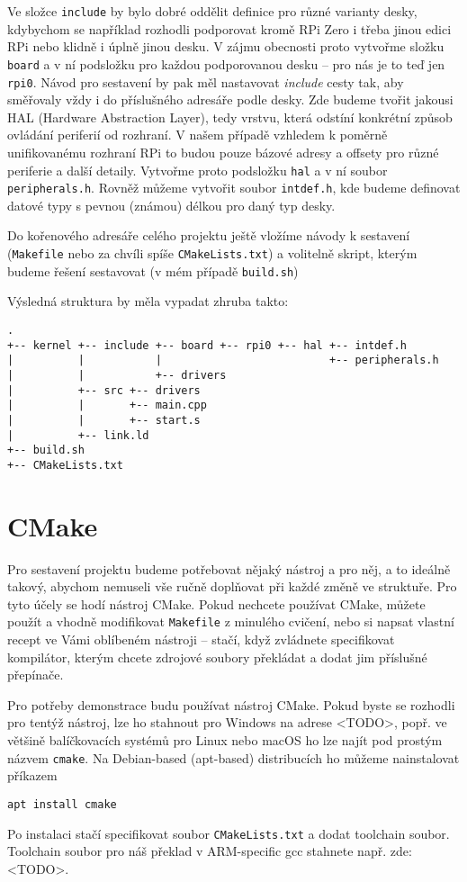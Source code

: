 \documentclass{article}
\begin{document}
Ve složce \texttt{include} by bylo dobré oddělit definice pro různé varianty desky, kdybychom se například rozhodli podporovat kromě RPi Zero i třeba jinou edici RPi nebo klidně i úplně jinou desku. V zájmu obecnosti proto vytvořme složku \texttt{board} a v ní podsložku pro každou podporovanou desku -- pro nás je to teď jen \texttt{rpi0}. Návod pro sestavení by pak měl nastavovat \emph{include} cesty tak, aby směřovaly vždy i do příslušného adresáře podle desky. Zde budeme tvořit jakousi HAL (Hardware Abstraction Layer), tedy vrstvu, která odstíní konkrétní způsob ovládání periferií od rozhraní. V našem případě vzhledem k poměrně unifikovanému rozhraní RPi to budou pouze bázové adresy a offsety pro různé periferie a další detaily. Vytvořme proto podsložku \texttt{hal} a v ní soubor \texttt{peripherals.h}. Rovněž můžeme vytvořit soubor \texttt{intdef.h}, kde budeme definovat datové typy s pevnou (známou) délkou pro daný typ desky.

Do kořenového adresáře celého projektu ještě vložíme návody k sestavení (\texttt{Makefile} nebo za chvíli spíše \texttt{CMakeLists.txt}) a volitelně skript, kterým budeme řešení sestavovat (v mém případě \texttt{build.sh})

Výsledná struktura by měla vypadat zhruba takto:

\begin{verbatim}
.
+-- kernel +-- include +-- board +-- rpi0 +-- hal +-- intdef.h
|          |           |                          +-- peripherals.h
|          |           +-- drivers
|          +-- src +-- drivers
|          |       +-- main.cpp
|          |       +-- start.s
|          +-- link.ld
+-- build.sh
+-- CMakeLists.txt
\end{verbatim}

\section{CMake}

Pro sestavení projektu budeme potřebovat nějaký nástroj a  pro něj, a to ideálně takový, abychom nemuseli vše ručně doplňovat při každé změně ve struktuře. Pro tyto účely se hodí nástroj CMake. Pokud nechcete používat CMake, můžete použít a vhodně modifikovat \texttt{Makefile} z minulého cvičení, nebo si napsat vlastní recept ve Vámi oblíbeném nástroji -- stačí, když zvládnete specifikovat kompilátor, kterým chcete zdrojové soubory překládat a dodat jim příslušné přepínače.

Pro potřeby demonstrace budu používat nástroj CMake. Pokud byste se rozhodli pro tentýž nástroj, lze ho stahnout pro Windows na adrese <TODO>, popř. ve většině balíčkovacích systémů pro Linux nebo macOS ho lze najít pod prostým názvem \texttt{cmake}. Na Debian-based (apt-based) distribucích ho můžeme nainstalovat příkazem
\begin{verbatim}
apt install cmake
\end{verbatim}
Po instalaci stačí specifikovat soubor \texttt{CMakeLists.txt} a dodat toolchain soubor. Toolchain soubor pro náš překlad v ARM-specific gcc stahnete např. zde: <TODO>.
\end{document}

